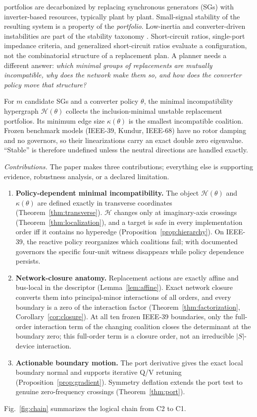 \documentclass[journal]{IEEEtran}
\theoremstyle{definition}
\theoremstyle{remark}
\newcommand{\Hy}{\mathcal{H}}
\begin{document}
 portfolios are decarbonized by replacing
synchronous generators (SGs) with inverter-based resources, typically plant by
plant. Small-signal stability of the resulting system is a property of the
\emph{portfolio}. Low-inertia and converter-driven instabilities are part of
the stability taxonomy \cite{hatziargyriou2021definition,
milano2018lowinertia, markovic2021lowinertia}. Short-circuit ratios,
single-port impedance criteria, and generalized short-circuit ratios
\cite{sun2011impedance, harnefors2007admittance, wang2019harmonic,
xin2016gscr, nerc2017lowstrength} evaluate a configuration, not the
combinatorial structure of a replacement plan. A planner needs a different
answer: \emph{which minimal groups of replacements are mutually incompatible,
why does the network make them so, and how does the converter policy move that
structure?}

For $m$ candidate SGs and a converter policy $\theta$, the minimal
incompatibility hypergraph $\Hy(\theta)$ collects the inclusion-minimal
unstable replacement portfolios. Its minimum edge size $\kappa(\theta)$ is the
smallest incompatible coalition. Frozen benchmark models (IEEE-39, Kundur,
IEEE-68) have no rotor damping and no governors, so their linearizations carry
an exact double zero eigenvalue. ``Stable'' is therefore undefined unless the
neutral directions are handled exactly.

\emph{Contributions.} The paper makes three contributions; everything else is
supporting evidence, robustness analysis, or a declared limitation.
\begin{enumerate}
\item[\textbf{C1}] \textbf{Policy-dependent minimal incompatibility.} The
object $\Hy(\theta)$ and $\kappa(\theta)$ are defined exactly in transverse
coordinates (Theorem~\ref{thm:transverse}). $\Hy$ changes only at
imaginary-axis crossings (Theorem~\ref{thm:localization}), and a target is safe
in every implementation order iff it contains no hyperedge
(Proposition~\ref{prop:hierarchy}). On IEEE-39, the reactive policy reorganizes
which coalitions fail; with documented governors the specific four-unit witness
disappears while policy dependence persists.
\item[\textbf{C2}] \textbf{Network-closure anatomy.} Replacement actions are
exactly affine and bus-local in the descriptor (Lemma~\ref{lem:affine}). Exact
network closure converts them into principal-minor interactions of all orders,
and every boundary is a zero of the interaction factor
(Theorem~\ref{thm:factorization}, Corollary~\ref{cor:closure}). At all ten
frozen IEEE-39 boundaries, only the full-order interaction term of the changing
coalition closes the determinant at the boundary zero; this full-order term is
a closure order, not an irreducible $|S|$-device interaction.
\item[\textbf{C3}] \textbf{Actionable boundary motion.} The port derivative
gives the exact local boundary normal and supports iterative Q/V retuning
(Proposition~\ref{prop:gradient}). Symmetry deflation extends the port test to
genuine zero-frequency crossings (Theorem~\ref{thm:port}).
\end{enumerate}
Fig.~\ref{fig:chain} summarizes the logical chain from C2 to C1.
\end{document}
